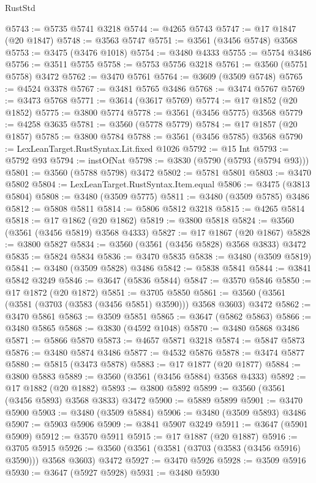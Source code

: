 \begin{lexlean}{RustStd}
\begin{coremodule}
@5743 := @5735 @5741 @3218
@5744 := @4265 @5743
@5747 := @17 @1847 (@20 @1847)
@5748 := @3563 @5747
@5751 := @3561 (@3456 @5748) @3568
@5753 := @3475 (@3476 @1018)
@5754 := @3480 @4333
@5755 := @5754 @3486
@5756 := @3511 @5755
@5758 := @5753 @5756 @3218
@5761 := @3560 (@5751 @5758) @3472
@5762 := @3470 @5761
@5764 := @3609 (@3509 @5748)
@5765 := @4524 @3378
@5767 := @3481 @5765 @3486
@5768 := @3474 @5767
@5769 := @3473 @5768
@5771 := @3614 (@3617 @5769)
@5774 := @17 @1852 (@20 @1852)
@5775 := @3800 @5774
@5778 := @3561 (@3456 @5775) @3568
@5779 := @4258 @3635
@5781 := @3560 (@5778 @5779)
@5784 := @17 @1857 (@20 @1857)
@5785 := @3800 @5784
@5788 := @3561 (@3456 @5785) @3568
@5790 := LexLeanTarget.RustSyntax.Lit.fixed @1026
@5792 := @15 Int
@5793 := @5792 @93
@5794 := instOfNat
@5798 := @3830 (@5790 (@5793 (@5794 @93)))
@5801 := @3560 (@5788 @5798) @3472
@5802 := @5781 @5801
@5803 := @3470 @5802
@5804 := LexLeanTarget.RustSyntax.Item.equal
@5806 := @3475 (@3813 @5804)
@5808 := @3480 (@3509 @5775)
@5811 := @3480 (@3509 @5785) @3486
@5812 := @5808 @5811
@5814 := @5806 @5812 @3218
@5815 := @4265 @5814
@5818 := @17 @1862 (@20 @1862)
@5819 := @3800 @5818
@5824 := @3560 (@3561 (@3456 @5819) @3568 @4333)
@5827 := @17 @1867 (@20 @1867)
@5828 := @3800 @5827
@5834 := @3560 (@3561 (@3456 @5828) @3568 @3833) @3472
@5835 := @5824 @5834
@5836 := @3470 @5835
@5838 := @3480 (@3509 @5819)
@5841 := @3480 (@3509 @5828) @3486
@5842 := @5838 @5841
@5844 := @3841 @5842 @3249
@5846 := @3647 (@5836 @5844)
@5847 := @3570 @5846
@5850 := @17 @1872 (@20 @1872)
@5851 := @3705 @5850
@5861 := @3560 (@3561 (@3581 (@3703 (@3583 (@3456 @5851) @3590))) @3568 @3603) @3472
@5862 := @3470 @5861
@5863 := @3509 @5851
@5865 := @3647 (@5862 @5863)
@5866 := @3480 @5865
@5868 := @3830 (@4592 @1048)
@5870 := @3480 @5868 @3486
@5871 := @5866 @5870
@5873 := @4657 @5871 @3218
@5874 := @5847 @5873
@5876 := @3480 @5874 @3486
@5877 := @4532 @5876
@5878 := @3474 @5877
@5880 := @5815 (@3473 @5878)
@5883 := @17 @1877 (@20 @1877)
@5884 := @3800 @5883
@5889 := @3560 (@3561 (@3456 @5884) @3568 @4333)
@5892 := @17 @1882 (@20 @1882)
@5893 := @3800 @5892
@5899 := @3560 (@3561 (@3456 @5893) @3568 @3833) @3472
@5900 := @5889 @5899
@5901 := @3470 @5900
@5903 := @3480 (@3509 @5884)
@5906 := @3480 (@3509 @5893) @3486
@5907 := @5903 @5906
@5909 := @3841 @5907 @3249
@5911 := @3647 (@5901 @5909)
@5912 := @3570 @5911
@5915 := @17 @1887 (@20 @1887)
@5916 := @3705 @5915
@5926 := @3560 (@3561 (@3581 (@3703 (@3583 (@3456 @5916) @3590))) @3568 @3603) @3472
@5927 := @3470 @5926
@5928 := @3509 @5916
@5930 := @3647 (@5927 @5928)
@5931 := @3480 @5930

\end{coremodule}
\end{lexlean}
